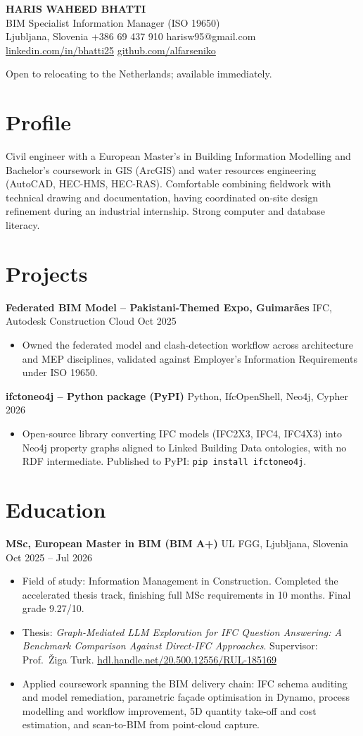 \documentclass[a4paper,10.5pt]{article}
\newcommand{\datefill}{\dotfill}
\newcommand{\entry}[3]{\vspace{2.5pt}\noindent\textbf{#1} \textbar{} #2 \datefill{} #3\par\vspace{0.5pt}}
\newcommand{\ROLELINE}{BIM Specialist \textbar{} Information Manager (ISO 19650)}
\newcommand{\projIfcToNeo}{%
\entry{ifctoneo4j -- Python package (PyPI)}{Python, IfcOpenShell, Neo4j, Cypher}{2026}
\begin{itemize}
  \item Open-source library converting IFC models (IFC2X3, IFC4, IFC4X3) into Neo4j
        property graphs aligned to Linked Building Data ontologies, with no RDF
        intermediate. Published to PyPI: \texttt{pip install ifctoneo4j}.
\end{itemize}}
\newcommand{\projGuimaraes}{%
\entry{Federated BIM Model -- Pakistani-Themed Expo, Guimar\~aes}{IFC, Autodesk Construction Cloud}{Oct 2025}
\begin{itemize}
  \item Owned the federated model and clash-detection workflow across architecture
        and MEP disciplines, validated against Employer's Information Requirements
        under ISO 19650.
\end{itemize}}
\begin{document}
\begin{center}
  {\LARGE\bfseries HARIS WAHEED BHATTI}\\[2pt]
  {\large \ROLELINE}\\[3pt]
  Ljubljana, Slovenia \textbar{} +386 69 437 910 \textbar{} harisw95@gmail.com\\
  \href{https://linkedin.com/in/bhatti25}{linkedin.com/in/bhatti25} \textbar{}
  \href{https://github.com/alfarseniko}{github.com/alfarseniko}
\end{center}
\vspace{-4pt}
\noindent\small Open to relocating to the Netherlands; available immediately.\normalsize

\section{Profile}

\noindent Civil engineer with a European Master's in Building Information Modelling and
Bachelor's coursework in GIS (ArcGIS) and water resources engineering (AutoCAD,
HEC-HMS, HEC-RAS). Comfortable combining fieldwork with technical drawing and
documentation, having coordinated on-site design refinement during an industrial
internship. Strong computer and database literacy.

\section{Projects}

 \projGuimaraes \projIfcToNeo

\section{Education}
\entry{MSc, European Master in BIM (BIM A+)}{UL FGG, Ljubljana, Slovenia}{Oct 2025 -- Jul 2026}
\begin{itemize}
  \item Field of study: Information Management in Construction. Completed the
        accelerated thesis track, finishing full MSc requirements in 10 months.
        Final grade 9.27/10.
  \item Thesis: \textit{Graph-Mediated LLM Exploration for IFC Question Answering:
        A Benchmark Comparison Against Direct-IFC Approaches}. Supervisor:
        Prof.~\v{Z}iga Turk. \href{http://hdl.handle.net/20.500.12556/RUL-185169}{hdl.handle.net/20.500.12556/RUL-185169}
  \item Applied coursework spanning the BIM delivery chain: IFC schema auditing and model remediation, parametric façade optimisation in Dynamo, process modelling and workflow improvement, 5D quantity take-off and cost estimation, and scan-to-BIM from point-cloud capture.
\end{itemize}
\end{document}
